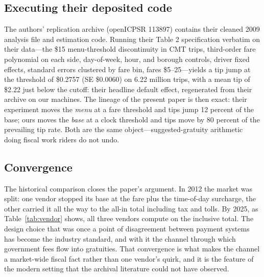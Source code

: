 \subsection{Executing their deposited code}
The authors' replication archive (openICPSR 113897) contains their
cleaned 2009 analysis file and estimation code. Running their Table 2
specification verbatim on their data---the \$15 menu-threshold
discontinuity in CMT trips, third-order fare polynomial on each side,
day-of-week, hour, and borough controls, driver fixed effects, standard
errors clustered by fare bin, fares \$5--25---yields a tip jump at the
threshold of \$0.2757 (SE \$0.0060) on 6.22 million trips, with a mean
tip of \$2.22 just below the cutoff: their headline default effect,
regenerated from their archive on our machines. The lineage of the
present paper is then exact: their experiment moves the \emph{menu} at
a fare threshold and tips jump 12 percent of the base; ours moves the
\emph{base} at a clock threshold and tips move by 80 percent of the
prevailing tip rate. Both are the same object---suggested-gratuity
arithmetic doing fiscal work riders do not undo.

\subsection{Convergence}
The historical comparison closes the paper's argument. In 2012 the
market was split: one vendor stopped its base at the fare plus the
time-of-day surcharge, the other carried it all the way to the all-in
total including tax and tolls. By 2025, as Table~\ref{tab:vendor} shows,
all three vendors compute on the inclusive total. The design choice that
was once a point of disagreement between payment systems has become the
industry standard, and with it the channel through which government fees
flow into gratuities. That convergence is what makes the channel a
market-wide fiscal fact rather than one vendor's quirk, and it is the
feature of the modern setting that the archival literature could not
have observed.

